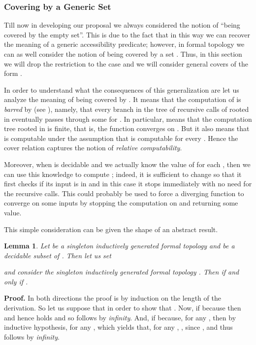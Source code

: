 \documentclass[copyright,creativecommons]{eptcs}
\newtheorem{lemma}[definition]{Lemma}
\begin{document}
\subsubsection{Covering by a Generic Set}
\label{genericCovering}

Till now in developing our proposal we always considered the notion of ``being
covered by the empty set''.
This is due to the fact that in this way we can recover the meaning of a
generic accessibility predicate; however, in formal topology we can as well consider the
notion of being covered by a set .
Thus, in this section we will drop the restriction to the case  
and we will consider general covers of the form .

In order to understand what the consequences of this generalization are let
us analyze the meaning of  being covered by .
It means that the computation of  is {\em barred} by  (see \cite{Val07}), namely, that 
every branch in the tree of recursive calls of  rooted in  eventually passes through 
some  for . 
In particular,  means that the computation tree rooted in  
is finite, that is, the function  converges on .
But it also means that  is computable under the assumption that  is
computable for every . 
Hence the cover relation captures the notion of {\em relative computability}.

Moreover, when  is decidable and we actually know the value of  for each , 
then we can use this knowledge to compute ; indeed, it is sufficient to change  so that 
it first checks if its input is in  and in this case it stops immediately with no need for the 
recursive calls.
This could probably be used to force a diverging function to converge on some inputs 
by stopping the computation on  and returning some value.

This simple consideration can be given the shape of an abstract result.

\begin{lemma}
Let  be a singleton inductively generated formal topology and  be a
decidable subset of .
Then let us set

and consider the singleton inductively generated formal topology .
Then  if and only if .
\end{lemma}
{\bf Proof.}
In both directions the proof is by induction on the length of the derivation.
So let us suppose that  in order to show that
.
Now, if  because  then 
and hence  holds and so
 follows by {\em infinity}.
And, if  because, for any , 
then by inductive hypothesis, for any , 
which yields that, for any , , since 
, and thus  follows by {\em infinity}.
\end{document}
